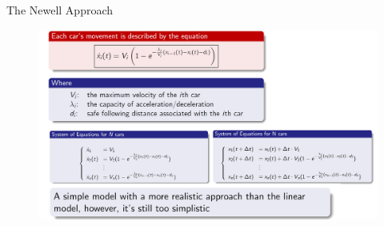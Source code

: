 \documentclass{beamer}
\begin{document}
\begin{frame}{The Newell Approach}
		\begin{figure}
			\includegraphics[width=1.0\textwidth]{test2.png}
		\end{figure}
\end{frame}
\end{document}
